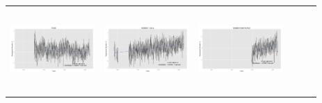 \documentclass[landscape,final,a0paper,fontscale=0.285]{baposter}
\begin{document}
\begin{poster}
{\begin{minipage}{\linewidth}
\begin{tabular}{@{}c@{}c@{}c@{}c@{}c@{}c@{}}
	\includegraphics[width=3.2cm,height=3.2cm]{X15130.png}&
	\includegraphics[width=3.2cm,height=3.2cm]{X15133.png}&
	\includegraphics[width=3.2cm,height=3.2cm]{X15135.png}\\
	                       
  \end{tabular}
  \end{minipage} 
 \vspace{0.03 cm}
}



%    
%


\end{poster}
\end{document}
